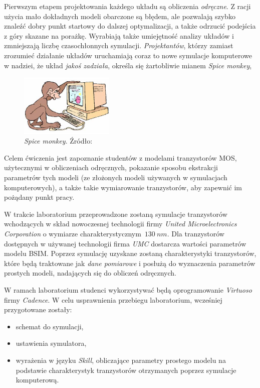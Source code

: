 \documentclass[twoside,pl,final]{labman}
\begin{document}
Pierwszym etapem projektowania każdego układu
są obliczenia \emph{odręczne}.
Z racji użycia mało dokładnych modeli obarczone są błędem,
ale pozwalają szybko znaleźć dobry punkt startowy do dalszej optymalizacji,
a także odrzucić podejścia z góry skazane na porażkę.
Wyrabiają także umiejętność analizy układów
i zmniejszają liczbę czasochłonnych symulacji.
\emph{Projektantów}, którzy zamiast zrozumieć działanie układów
uruchamiają coraz to nowe symulacje komputerowe w nadziei,
że układ \emph{jakoś zadziała}, określa się żartobliwie mianem
\emph{Spice monkey},~

\begin{figure}[!htbp]
  \centering
  \includegraphics[width=0.4\textwidth]{spicemonkey}
  \caption[\emph{Spice monkey}]{\emph{Spice monkey}. Źródło:~\cite{murmann}}
  \label{fig:spicemonkey}
\end{figure}

Celem ćwiczenia jest zapoznanie studentów z modelami tranzystorów MOS,
użytecznymi w obliczeniach odręcznych,
pokazanie sposobu ekstrakcji parametrów tych modeli
(ze złożonych modeli używanych w symulacjach komputerowych),
a także takie wymiarowanie tranzystorów, aby zapewnić im pożądany punkt pracy.

W trakcie laboratorium przeprowadzone zostaną symulacje tranzystorów wchodzących
w skład nowoczesnej technologii firmy \emph{United Microelectronics Corporation}
o wymiarze charakterystycznym~$130~nm$.
Dla tranzystorów dostępnych w używanej technologii firma \emph{UMC}
dostarcza wartości parametrów modelu BSIM.
Poprzez symulację uzyskane zostaną charakterystyki tranzystorów,
które będą traktowane jak \emph{dane pomiarowe} i posłużą do wyznaczenia
parametrów prostych modeli, nadających się do obliczeń odręcznych.

W ramach laboratorium studenci wykorzystywać będą oprogramowanie
\emph{Virtuoso} firmy \emph{Cadence}.
W celu usprawnienia przebiegu laboratorium, wcześniej przygotowane zostały:
\begin{itemize}
  \item schemat do symulacji,
  \item ustawienia symulatora,
  \item wyrażenia w języku \emph{Skill},
    obliczające parametry prostego modelu na podstawie charakterystyk
    tranzystorów otrzymanych poprzez symulacje komputerową.
\end{itemize}
\end{document}
